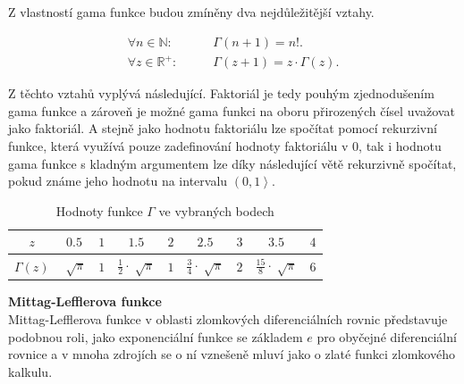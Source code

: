 \documentclass[a4paper,12pt,twoside]{article}
\newtheorem{veta}{Věta}[section]
\theoremstyle{definition}
\theoremstyle{remark}
\numberwithin{equation}{section}
\numberwithin{table}{section}
\numberwithin{figure}{section}
\newcommand{\R}{\mathbb{R}}
\newcommand{\N}{\mathbb{N}}
\begin{document}
Z vlastností gama funkce budou zmíněny dva nejdůležitější vztahy.

\begin{align} 	
	\forall n \in \N:	\qquad  &\Gamma\left( n+1\right)  = n!.\label{gamma}\\
	\forall z \in \R^{+}:\qquad &\Gamma\left( z+1\right)  = z \cdot \Gamma\left(z\right).\label{gamma2}
\end{align}

Z těchto vztahů vyplývá následující. Faktoriál je tedy pouhým zjednodušením gama funkce a zároveň je možné gama funkci na oboru přirozených čísel uvažovat jako faktoriál. A stejně jako hodnotu faktoriálu lze spočítat pomocí rekurzivní funkce, která využívá pouze zadefinování hodnoty faktoriálu v 0, tak i hodnotu gama funkce s kladným argumentem lze díky následující větě rekurzivně spočítat, pokud známe jeho hodnotu na intervalu $\left( 0, 1\right\rangle $.


\begin{table}[h!]
	\centering
	\caption{Hodnoty funkce $\Gamma$ ve vybraných bodech}\label{tab1}
	\begin{tabular}{|c|cccccccc|}
		\toprule
		$z$ 					& $0.5$				&	$1$ &	$1.5$ 							&	$2$ & $2.5$ 							& $3$ & $3.5$ 							&	$4$ 		\\\midrule
		$\Gamma \left(z\right)$ & $\sqrt[]{\pi}$ 	& 	$1$ &	${\frac{1}{2}}\cdot\sqrt[]{\pi}$&	$1$ & ${\frac{3}{4}}\cdot\sqrt[]{\pi}$ 	& $2$ &	${\frac{15}{8}}\cdot\sqrt[]{\pi}$ & $6$ \\
		\bottomrule
	\end{tabular}
\end{table}

\textbf{Mittag-Lefflerova funkce}\\
Mittag-Lefflerova funkce v oblasti zlomkových diferenciálních rovnic představuje podobnou roli, jako exponenciální funkce se základem $e$ pro obyčejné diferenciální rovnice a v mnoha zdrojích se o ní vznešeně mluví jako o zlaté funkci zlomkového kalkulu.
\end{document}
